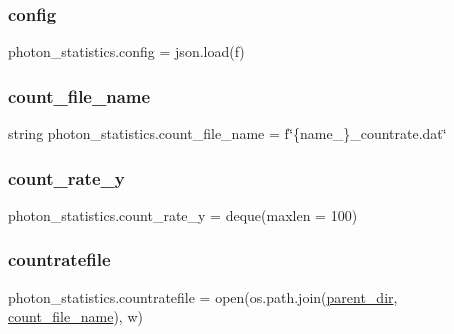 \subsubsection{\texorpdfstring{config}{config}}
{\footnotesize\ttfamily photon\+\_\+statistics.\+config = json.\+load(f)}

\mbox{\label{namespacephoton__statistics_aefac3a6449e578f00a5870a4249bf7ea}} 
\subsubsection{\texorpdfstring{count\+\_\+file\+\_\+name}{count\_file\_name}}
{\footnotesize\ttfamily string photon\+\_\+statistics.\+count\+\_\+file\+\_\+name = f\char`\"{}\{name\+\_\+\}\+\_\+countrate.\+dat\char`\"{}}

\mbox{\label{namespacephoton__statistics_a9939968ed5be4ad1c5c6264ed0a875e9}} 
\subsubsection{\texorpdfstring{count\+\_\+rate\+\_\+y}{count\_rate\_y}}
{\footnotesize\ttfamily photon\+\_\+statistics.\+count\+\_\+rate\+\_\+y = deque(maxlen = 100)}

\mbox{\label{namespacephoton__statistics_af015eefc8f4b272cae12b376618be9dc}} 
\subsubsection{\texorpdfstring{countratefile}{countratefile}}
{\footnotesize\ttfamily photon\+\_\+statistics.\+countratefile = open(os.\+path.\+join(\hyperlink{namespacephoton__statistics_a255f06b87745f05837e1623b921ae692}{parent\+\_\+dir}, \hyperlink{namespacephoton__statistics_aefac3a6449e578f00a5870a4249bf7ea}{count\+\_\+file\+\_\+name}), \textquotesingle{}w\textquotesingle{})}

